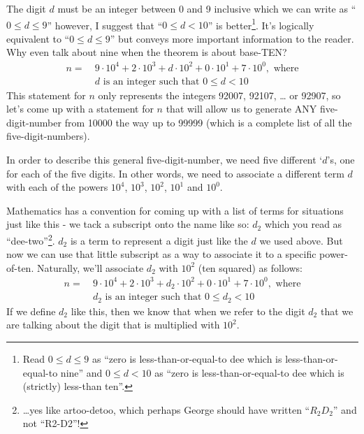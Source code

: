 \documentclass{article}
\begin{document}
The digit $d$ must be an integer between 0 and 9 inclusive 
which we can write as ``$0\le{}d\le{}9$'' however, I suggest that ``$0\le{}d<10$'' is better\footnote{Read 
$0\le{}d\le{}9$ as ``zero is less-than-or-equal-to dee which is less-than-or-equal-to nine''
and $0\le{}d<10$ as ``zero is less-than-or-equal-to dee which is (strictly) less-than ten''.}.
It's logically equivalent to ``$0\le{}d\le{}9$''  but conveys more important information
to the reader. Why even talk about nine when the theorem is about base-TEN?
\begin{align*}
n =\ &9{\cdot}10^4+2{\cdot}10^3+d{\cdot}10^2+0{\cdot}10^1+7{\cdot}10^0,\text{ where}\\
&d\text{ is an integer such that }0\le{}d<10
\end{align*}
This statement for $n$ only represents the integers 92007, 92107, \dots{} or 92907, so let's come up
with a statement for $n$ that will allow us to generate ANY five-digit-number from 10000 
the way up to 99999 (which is a complete list of all the five-digit-numbers).

In order to describe this general five-digit-number, we need
five different `$d$'s, one for each of the five digits.
In other words, we need to associate a different term $d$ with each of the powers
$10^4$, $10^3$, $10^2$, $10^1$ and $10^0$.

Mathematics has a convention for coming up with
a list of terms for situations just like this -
we tack a subscript onto the name like so: $d_2$ which
you read as ``dee-two''\footnote{\dots{}yes like artoo-detoo, which perhaps
George should have written ``$R_2D_2$'' and not ``R2-D2''!}.
$d_2$ is a term to represent a digit just like the $d$ we used above.
But now we can use that little subscript as a way to
associate it to a specific power-of-ten.
Naturally, we'll associate $d_2$ with $10^2$ (ten squared) as follows:
\begin{align*}
n =\ &9{\cdot}10^4+2{\cdot}10^3+d_2{\cdot}10^2+0{\cdot}10^1+7{\cdot}10^0,\text{ where}\\
&d_2\text{ is an integer such that }0\le{}d_2<10
\end{align*}
If we define $d_2$ like this, then we know that when we refer to the digit $d_2$
that we are talking about the digit that is multiplied with $10^2$.
\end{document}
